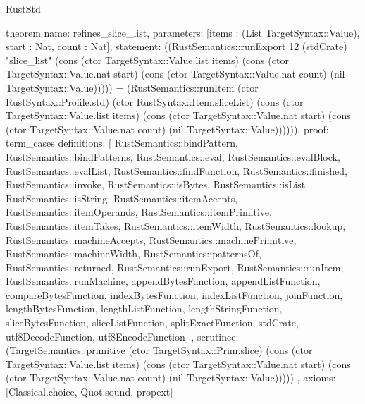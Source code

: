 \begin{lexlean}{RustStd}
\begin{semanticmodule}
theorem{
  name: refines_slice_list,
  parameters: [items : (List TargetSyntax::Value), start : Nat, count : Nat],
  statement: ((RustSemantics::runExport 12 (stdCrate) "slice_list" (cons (ctor TargetSyntax::Value.list items) (cons (ctor TargetSyntax::Value.nat start) (cons (ctor TargetSyntax::Value.nat count) (nil TargetSyntax::Value))))) = (RustSemantics::runItem (ctor RustSyntax::Profile.std) (ctor RustSyntax::Item.sliceList) (cons (ctor TargetSyntax::Value.list items) (cons (ctor TargetSyntax::Value.nat start) (cons (ctor TargetSyntax::Value.nat count) (nil TargetSyntax::Value)))))),
  proof: term_cases{
    definitions: [
      RustSemantics::bindPattern,
      RustSemantics::bindPatterns,
      RustSemantics::eval,
      RustSemantics::evalBlock,
      RustSemantics::evalList,
      RustSemantics::findFunction,
      RustSemantics::finished,
      RustSemantics::invoke,
      RustSemantics::isBytes,
      RustSemantics::isList,
      RustSemantics::isString,
      RustSemantics::itemAccepts,
      RustSemantics::itemOperands,
      RustSemantics::itemPrimitive,
      RustSemantics::itemTakes,
      RustSemantics::itemWidth,
      RustSemantics::lookup,
      RustSemantics::machineAccepts,
      RustSemantics::machinePrimitive,
      RustSemantics::machineWidth,
      RustSemantics::patternsOf,
      RustSemantics::returned,
      RustSemantics::runExport,
      RustSemantics::runItem,
      RustSemantics::runMachine,
      appendBytesFunction,
      appendListFunction,
      compareBytesFunction,
      indexBytesFunction,
      indexListFunction,
      joinFunction,
      lengthBytesFunction,
      lengthListFunction,
      lengthStringFunction,
      sliceBytesFunction,
      sliceListFunction,
      splitExactFunction,
      stdCrate,
      utf8DecodeFunction,
      utf8EncodeFunction
    ],
    scrutinee: (TargetSemantics::primitive (ctor TargetSyntax::Prim.slice) (cons (ctor TargetSyntax::Value.list items) (cons (ctor TargetSyntax::Value.nat start) (cons (ctor TargetSyntax::Value.nat count) (nil TargetSyntax::Value)))))
  },
  axioms: [Classical.choice, Quot.sound, propext]
}


\end{semanticmodule}
\end{lexlean}
